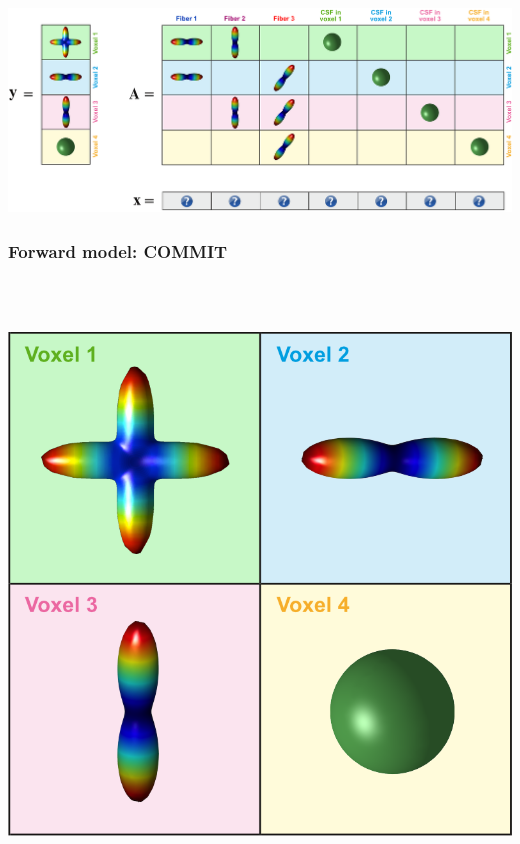 \documentclass[aspectratio=169]{beamer}
\begin{document}
\begin{frame}
\begin{center}
		\includegraphics[width=.8\linewidth]{img/commit/COMMIT_idea_7}
		\end{center}
		\end{frame}
		
		\begin{frame}
		\frametitle{Forward model: COMMIT}
		\quad \\ \quad \\
		\begin{center}
		\begin{minipage}{.15\linewidth}
		\begin{center}
		\includegraphics[width=\linewidth]{img/commit/COMMIT_idea_1_var}
		\end{center}
		\end{minipage}\qquad \qquad
		\begin{minipage}{.15\linewidth}
		\begin{center}

\end{center}
\end{minipage}
\end{center}
\end{frame}
\end{document}
